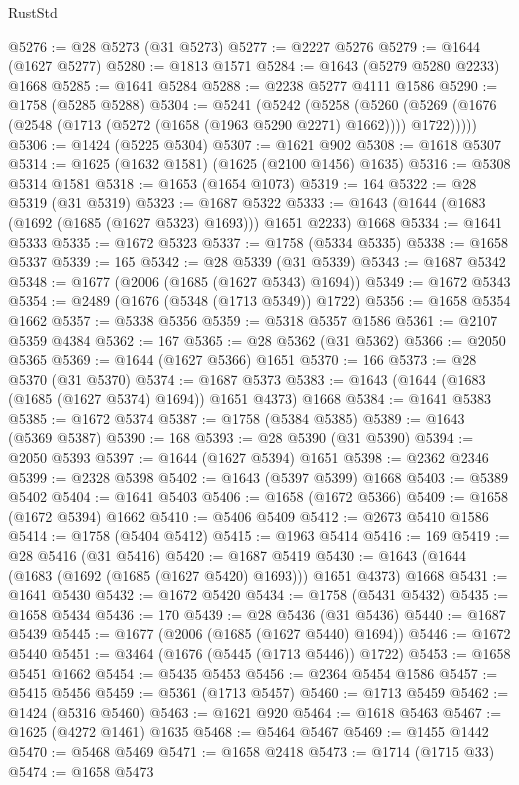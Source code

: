 \begin{lexlean}{RustStd}
\begin{coremodule}
@5276 := @28 @5273 (@31 @5273)
@5277 := @2227 @5276
@5279 := @1644 (@1627 @5277)
@5280 := @1813 @1571
@5284 := @1643 (@5279 @5280 @2233) @1668
@5285 := @1641 @5284
@5288 := @2238 @5277 @4111 @1586
@5290 := @1758 (@5285 @5288)
@5304 := @5241
    (@5242
      (@5258
        (@5260 (@5269 (@1676 (@2548 (@1713 (@5272 (@1658 (@1963 @5290 @2271) @1662)))) @1722)))))
@5306 := @1424 (@5225 @5304)
@5307 := @1621 @902
@5308 := @1618 @5307
@5314 := @1625 (@1632 @1581) (@1625 (@2100 @1456) @1635)
@5316 := @5308 @5314 @1581
@5318 := @1653 (@1654 @1073)
@5319 := 164
@5322 := @28 @5319 (@31 @5319)
@5323 := @1687 @5322
@5333 := @1643 (@1644 (@1683 (@1692 (@1685 (@1627 @5323) @1693))) @1651 @2233) @1668
@5334 := @1641 @5333
@5335 := @1672 @5323
@5337 := @1758 (@5334 @5335)
@5338 := @1658 @5337
@5339 := 165
@5342 := @28 @5339 (@31 @5339)
@5343 := @1687 @5342
@5348 := @1677 (@2006 (@1685 (@1627 @5343) @1694))
@5349 := @1672 @5343
@5354 := @2489 (@1676 (@5348 (@1713 @5349)) @1722)
@5356 := @1658 @5354 @1662
@5357 := @5338 @5356
@5359 := @5318 @5357 @1586
@5361 := @2107 @5359 @4384
@5362 := 167
@5365 := @28 @5362 (@31 @5362)
@5366 := @2050 @5365
@5369 := @1644 (@1627 @5366) @1651
@5370 := 166
@5373 := @28 @5370 (@31 @5370)
@5374 := @1687 @5373
@5383 := @1643 (@1644 (@1683 (@1685 (@1627 @5374) @1694)) @1651 @4373) @1668
@5384 := @1641 @5383
@5385 := @1672 @5374
@5387 := @1758 (@5384 @5385)
@5389 := @1643 (@5369 @5387)
@5390 := 168
@5393 := @28 @5390 (@31 @5390)
@5394 := @2050 @5393
@5397 := @1644 (@1627 @5394) @1651
@5398 := @2362 @2346
@5399 := @2328 @5398
@5402 := @1643 (@5397 @5399) @1668
@5403 := @5389 @5402
@5404 := @1641 @5403
@5406 := @1658 (@1672 @5366)
@5409 := @1658 (@1672 @5394) @1662
@5410 := @5406 @5409
@5412 := @2673 @5410 @1586
@5414 := @1758 (@5404 @5412)
@5415 := @1963 @5414
@5416 := 169
@5419 := @28 @5416 (@31 @5416)
@5420 := @1687 @5419
@5430 := @1643 (@1644 (@1683 (@1692 (@1685 (@1627 @5420) @1693))) @1651 @4373) @1668
@5431 := @1641 @5430
@5432 := @1672 @5420
@5434 := @1758 (@5431 @5432)
@5435 := @1658 @5434
@5436 := 170
@5439 := @28 @5436 (@31 @5436)
@5440 := @1687 @5439
@5445 := @1677 (@2006 (@1685 (@1627 @5440) @1694))
@5446 := @1672 @5440
@5451 := @3464 (@1676 (@5445 (@1713 @5446)) @1722)
@5453 := @1658 @5451 @1662
@5454 := @5435 @5453
@5456 := @2364 @5454 @1586
@5457 := @5415 @5456
@5459 := @5361 (@1713 @5457)
@5460 := @1713 @5459
@5462 := @1424 (@5316 @5460)
@5463 := @1621 @920
@5464 := @1618 @5463
@5467 := @1625 (@4272 @1461) @1635
@5468 := @5464 @5467
@5469 := @1455 @1442
@5470 := @5468 @5469
@5471 := @1658 @2418
@5473 := @1714 (@1715 @33)
@5474 := @1658 @5473

\end{coremodule}
\end{lexlean}
